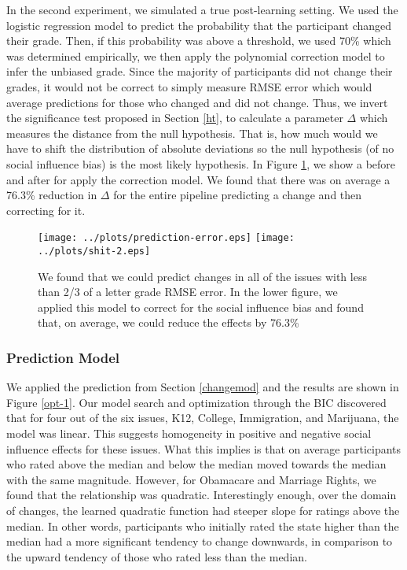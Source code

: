 In the second experiment, we simulated a true post-learning setting.
We used the logistic regression model to predict the probability that the participant changed their grade.
Then, if this probability was above a threshold, we used 70\% which was determined empirically, we then apply the polynomial correction model
to infer the unbiased grade.
Since the majority of participants did not change their grades, it would not be correct to simply measure RMSE error which would average predictions for those who changed and did not change.
Thus, we invert the significance test proposed in Section \ref{ht}, to calculate a parameter $\Delta$ which measures the distance from the null hypothesis.
That is, how much would we have to shift the distribution of absolute deviations so the null hypothesis (of no social influence bias) is the most likely hypothesis.
In Figure \ref{poly-1}, we show a before and after for apply the correction model.
We found that there was on average a 76.3\% reduction in $\Delta$ for the entire pipeline predicting a change and then correcting for it. 

\begin{figure}[h]
\hspace*{-2em}
    \texttt{[image: ../plots/prediction-error.eps]}
    \hspace*{-2em}
    \texttt{[image: ../plots/shit-2.eps]}
      \caption{We found that we could predict changes in all of the issues with less than 2/3 of a letter grade RMSE error. In the lower figure, we applied this model to correct for the social influence bias and found that, on average, we could reduce the effects by 76.3\%}
      \label{poly-1}
\end{figure}

\subsubsection{Prediction Model}
We applied the prediction from Section \ref{changemod} and the results are shown in Figure \ref{opt-1}.
Our model search and optimization through the BIC discovered that for four out of the six issues, K12, College, Immigration, and Marijuana, the model was linear.
This suggests homogeneity in positive and negative social influence effects for these issues.
What this implies is that on average participants who rated above the median and below the median moved towards the median with the same magnitude.
However, for Obamacare and Marriage Rights, we found that the relationship was quadratic.
Interestingly enough, over the domain of changes, the learned quadratic function had steeper slope for ratings above the median.
In other words, participants who initially rated the state higher than the median had a more significant tendency to change downwards, in comparison to the upward tendency of those who rated less than the median.

